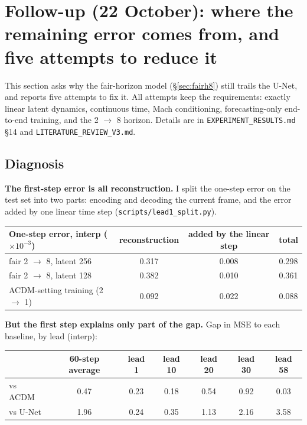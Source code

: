 \section{Follow-up (22 October): where the remaining error comes from, and five attempts to reduce it}\label{sec:round4}

This section asks why the fair-horizon model (\S\ref{sec:fairh8}) still trails the U-Net,
and reports five attempts to fix it. All attempts keep the requirements: exactly linear
latent dynamics, continuous time, Mach conditioning, forecasting-only end-to-end training,
and the 2 $\to$ 8 horizon. Details are in \texttt{EXPERIMENT\_RESULTS.md} \S14 and
\texttt{LITERATURE\_REVIEW\_V3.md}.

\subsection{Diagnosis}\label{sec:diag4}

\textbf{The first-step error is all reconstruction.} I split the one-step error on the test
set into two parts: encoding and decoding the current frame, and the error added by one
linear time step (\texttt{scripts/lead1\_split.py}).

\begin{center}\small
\begin{tabular}{lccc}
\toprule
One-step error, interp ($\times10^{-3}$) & reconstruction & added by the linear step & total\\
\midrule
fair 2 $\to$ 8, latent 256 & 0.317 & 0.008 & 0.298\\
fair 2 $\to$ 8, latent 128 & 0.382 & 0.010 & 0.361\\
ACDM-setting training (2 $\to$ 1) & 0.092 & 0.022 & 0.088\\
\bottomrule
\end{tabular}
\end{center}

\textbf{But the first step explains only part of the gap.} Gap in MSE to each baseline, by
lead (interp):

\begin{center}\small
\begin{tabular}{lcccccc}
\toprule
 & 60-step average & lead 1 & lead 10 & lead 20 & lead 30 & lead 58\\
\midrule
vs ACDM  & 0.47 & 0.23 & 0.18 & 0.54 & 0.92 & 0.03\\
vs U-Net & 1.96 & 0.24 & 0.35 & 1.13 & 2.16 & 3.58\\
\bottomrule
\end{tabular}
\end{center}

